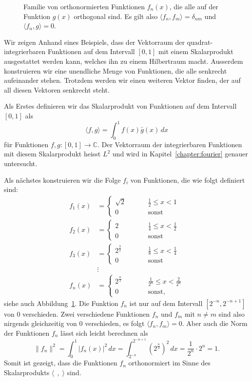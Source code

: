 \begin{beispiel}
\begin{figure}
\caption{Familie von orthonormierten Funktionen $f_n(x)$, die alle auf der
Funktion $g(x)$ orthogonal sind.
Es gilt also $\langle f_n,f_m\rangle = \delta_{nm}$ und
$\langle f_n,g\rangle=0$.
\label{l2orth}}
\end{figure}
Wir zeigen Anhand eines Beispiels, dass der Vektorraum  der
quadrat-integrierbaren
Funktionen auf dem Intervall $[0,1]$ mit einem Skalarprodukt
ausgestattet werden kann, welches ihn zu einem Hilbertraum macht.
Ausserdem konstruieren wir eine unendliche Menge von Funktionen, die alle
senkrecht aufeinander stehen.
Trotzdem werden wir einen weiteren Vektor finden, der auf all diesen
Vektoren senkrecht steht.

Als Erstes definieren wir das Skalarprodukt von Funktionen auf dem
Intervall $[0,1]$ als
\[
\langle f, g\rangle
=
\int_0^1 f(x) \bar{g}(x)\,dx
\]
für Funktionen $f,g\colon [0,1]\to\mathbb C$.
Der Vektorraum der integrierbaren Funktionen mit diesem Skalarprodukt
heisst $L^2$ und wird in Kapitel~\ref{chapter:fourier} genauer untersucht.

Als nächstes konstruieren wir die Folge $f_i$ von Funktionen, die wie
folgt definiert sind:
\begin{align*}
f_1(x) &= \begin{cases}
\sqrt{2}&\qquad \frac12 \le x < 1\\
0\phantom{000}&\qquad\text{sonst}
\end{cases}
\\
f_2(x) &= \begin{cases}
2&\qquad \frac14 \le x < \frac12\\
0\phantom{000}&\qquad\text{sonst}
\end{cases}
\\
f_3(x) &= \begin{cases}
2^{\frac32}&\qquad \frac18 \le x < \frac14\\
0\phantom{000}&\qquad\text{sonst}
\end{cases}
\\
&\vdots
\\
f_n(x) &= \begin{cases}
2^{\frac{n}2}&\qquad \frac1{2^n} \le x < \frac2{2^n}\\
0\phantom{000}&\qquad\text{sonst,}
\end{cases}
\end{align*}
siehe auch Abbildung~\ref{l2orth}.
Die Funktion $f_n$ ist nur auf dem Intervall $[2^{-n},2^{-n+1}]$ von
$0$ verschieden.
Zwei verschiedene Funktionen $f_n$ und $f_m$ mit $n\ne m$ sind also
nirgends gleichzeitig von $0$ verschieden, es folgt
$\langle f_n,f_m\rangle =0$.
Aber auch die Norm der Funktionen $f_n$ lässt sich leicht berechnen als
\[
\|f_n\|^2
=
\int_0^1 |f_n(x)|^2\,dx
=
\int_{2^{-n}}^{2^{-n+1}} (2^{\frac{n}2})^2 \,dx
=
\frac1{2^n}\cdot 2^n = 1.
\]
Somit ist gezeigt, dass die Funktionen $f_n$ orthonormiert im Sinne des
Skalarprodukts $\langle\;\,,\;\rangle$ sind.


\end{beispiel}
